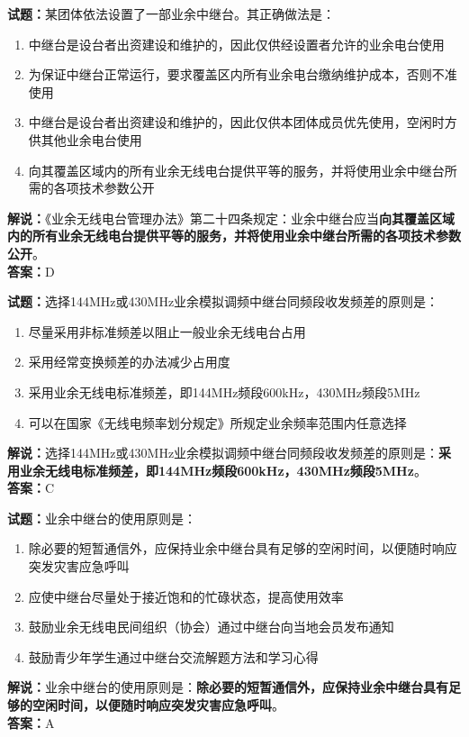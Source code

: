 \documentclass{ctexbook}
\begin{document}
\bigskip

\noindent\textbf{试题：}某团体依法设置了一部业余中继台。其正确做法是：
\begin{enumerate}[leftmargin=3em]
  \item 中继台是设台者出资建设和维护的，因此仅供经设置者允许的业余电台使用
  \item 为保证中继台正常运行，要求覆盖区内所有业余电台缴纳维护成本，否则不准使用
  \item 中继台是设台者出资建设和维护的，因此仅供本团体成员优先使用，空闲时方供其他业余电台使用
  \item 向其覆盖区域内的所有业余无线电台提供平等的服务，并将使用业余中继台所需的各项技术参数公开
\end{enumerate}
\noindent\textbf{解说：}《业余无线电台管理办法》第二十四条规定：业余中继台应当\textbf{向其覆盖区域内的所有业余无线电台提供平等的服务，并将使用业余中继台所需的各项技术参数公开}。\\\noindent\textbf{答案：}D

\bigskip

\noindent\textbf{试题：}选择144\unit{\MHz}或430\unit{\MHz}业余模拟调频中继台同频段收发频差的原则是：
\begin{enumerate}[leftmargin=3em]
  \item 尽量采用非标准频差以阻止一般业余无线电台占用
  \item 采用经常变换频差的办法减少占用度
  \item 采用业余无线电标准频差，即144\unit{\MHz}频段600\unit{\kHz}，430\unit{\MHz}频段5\unit{\MHz}
  \item 可以在国家《无线电频率划分规定》所规定业余频率范围内任意选择
\end{enumerate}
\noindent\textbf{解说：}选择144\unit{\MHz}或430\unit{\MHz}业余模拟调频中继台同频段收发频差的原则是：\textbf{采用业余无线电标准频差，即144\unit{\MHz}频段600\unit{\kHz}，430\unit{\MHz}频段5\unit{\MHz}}。\\\noindent\textbf{答案：}C

\bigskip

\noindent\textbf{试题：}业余中继台的使用原则是：
\begin{enumerate}[leftmargin=3em]
  \item 除必要的短暂通信外，应保持业余中继台具有足够的空闲时间，以便随时响应突发灾害应急呼叫
  \item 应使中继台尽量处于接近饱和的忙碌状态，提高使用效率
  \item 鼓励业余无线电民间组织（协会）通过中继台向当地会员发布通知
  \item 鼓励青少年学生通过中继台交流解题方法和学习心得
\end{enumerate}
\noindent\textbf{解说：}业余中继台的使用原则是：\textbf{除必要的短暂通信外，应保持业余中继台具有足够的空闲时间，以便随时响应突发灾害应急呼叫}。\\\noindent\textbf{答案：}A
\end{document}
